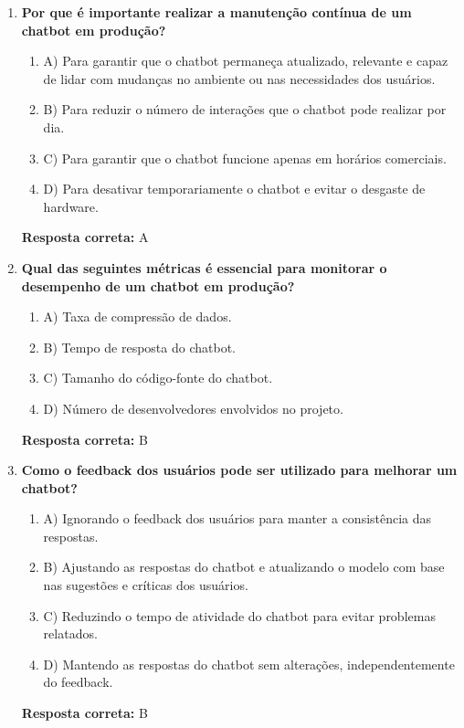 \documentclass[14pt,a4paper,oneside]{book}
\begin{document}
\begin{enumerate}
	
	\item \textbf{Por que é importante realizar a manutenção contínua de um chatbot em produção?}
	\begin{enumerate}[label=\alph*)]
		\item A) Para garantir que o chatbot permaneça atualizado, relevante e capaz de lidar com mudanças no ambiente ou nas necessidades dos usuários.
		\item B) Para reduzir o número de interações que o chatbot pode realizar por dia.
		\item C) Para garantir que o chatbot funcione apenas em horários comerciais.
		\item D) Para desativar temporariamente o chatbot e evitar o desgaste de hardware.
	\end{enumerate}
	\vspace{5mm}
	\textbf{Resposta correta:} A
	
	\item \textbf{Qual das seguintes métricas é essencial para monitorar o desempenho de um chatbot em produção?}
	\begin{enumerate}[label=\alph*)]
		\item A) Taxa de compressão de dados.
		\item B) Tempo de resposta do chatbot.
		\item C) Tamanho do código-fonte do chatbot.
		\item D) Número de desenvolvedores envolvidos no projeto.
	\end{enumerate}
	\vspace{5mm}
	\textbf{Resposta correta:} B
	
	\item \textbf{Como o feedback dos usuários pode ser utilizado para melhorar um chatbot?}
	\begin{enumerate}[label=\alph*)]
		\item A) Ignorando o feedback dos usuários para manter a consistência das respostas.
		\item B) Ajustando as respostas do chatbot e atualizando o modelo com base nas sugestões e críticas dos usuários.
		\item C) Reduzindo o tempo de atividade do chatbot para evitar problemas relatados.
		\item D) Mantendo as respostas do chatbot sem alterações, independentemente do feedback.
	\end{enumerate}
	\vspace{5mm}
	\textbf{Resposta correta:} B
	

\end{enumerate}
\end{document}
